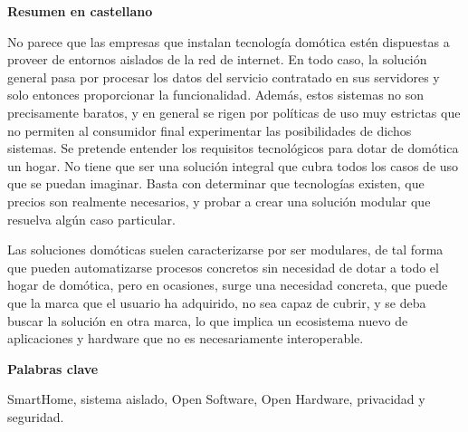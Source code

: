 
\newpage

\thispagestyle{empty}

\begin{center}

{\bf \Huge Resumen en castellano}

  \end{center}
\vspace{1cm}

No parece que las empresas que instalan tecnología domótica estén dispuestas a proveer de entornos aislados de la red de internet. En todo caso, la solución general pasa por procesar los datos del servicio contratado en sus servidores y solo entonces proporcionar la funcionalidad. Además, estos sistemas no son precisamente baratos, y en general se rigen por políticas de uso muy estrictas que no permiten al consumidor final experimentar las posibilidades de dichos sistemas. Se pretende entender los requisitos tecnológicos para dotar de domótica un hogar. No tiene que ser una solución integral que cubra todos los casos de uso que se puedan imaginar. Basta con determinar que tecnologías existen, que precios son realmente necesarios, y probar a crear una solución modular que resuelva algún caso particular.

\vspace{0.5cm}

Las soluciones domóticas suelen caracterizarse por ser modulares, de tal forma que pueden automatizarse procesos concretos sin necesidad de dotar a todo el hogar de domótica, pero en ocasiones, surge una necesidad concreta, que puede que la marca que el usuario ha adquirido, no sea capaz de cubrir, y se deba buscar la solución en otra marca, lo que implica un ecosistema nuevo de aplicaciones y hardware que no es necesariamente interoperable.


\vspace{1cm}


\begin{center}

{\bf \Large Palabras clave}

   \end{center}

   \vspace{0.5cm}

   SmartHome, sistema aislado, Open Software, Open Hardware, privacidad y seguridad.
